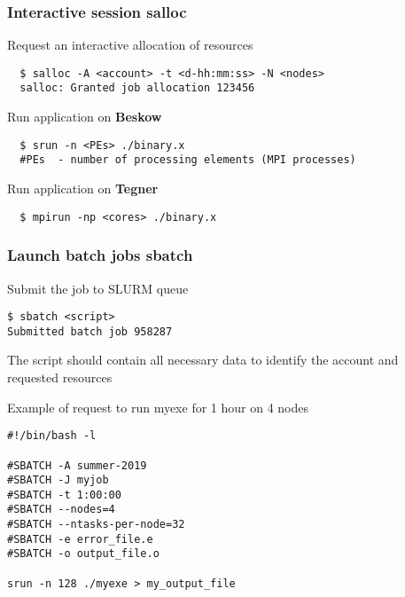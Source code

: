 \begin{frame}[fragile]
\frametitle{Interactive session \hfill \alert{\textbf{salloc}}}

\begin{exampleblock}{Request an interactive allocation of resources}
  \begin{verbatim}
  $ salloc -A <account> -t <d-hh:mm:ss> -N <nodes>
  salloc: Granted job allocation 123456
  \end{verbatim}
\end{exampleblock}

\begin{exampleblock}{Run application on \alert{\textbf{Beskow}}}
  \begin{verbatim}
  $ srun -n <PEs> ./binary.x
  #PEs 	- number of processing elements (MPI processes)
  \end{verbatim}
\end{exampleblock}
  
  
\begin{exampleblock}{Run application on \alert{\textbf{Tegner}}}

  \begin{verbatim}
  $ mpirun -np <cores> ./binary.x
  \end{verbatim}
\end{exampleblock}
\end{frame}

\begin{frame}[fragile]
\frametitle{Launch batch jobs \hfill  \alert{\textbf{sbatch}}}
\begin{exampleblock}{Submit the job to SLURM queue}
  \begin{verbatim}
$ sbatch <script>
Submitted batch job 958287
  \end{verbatim}
\end{exampleblock}

\scriptsize
The script should contain all necessary data to identify the account and requested resources 
\begin{exampleblock}{Example of request to run myexe for 1 hour on 4 nodes}
  \begin{verbatim}
#!/bin/bash -l

#SBATCH -A summer-2019
#SBATCH -J myjob
#SBATCH -t 1:00:00
#SBATCH --nodes=4
#SBATCH --ntasks-per-node=32
#SBATCH -e error_file.e
#SBATCH -o output_file.o

srun -n 128 ./myexe > my_output_file
  \end{verbatim}
\end{exampleblock}

\end{frame}

